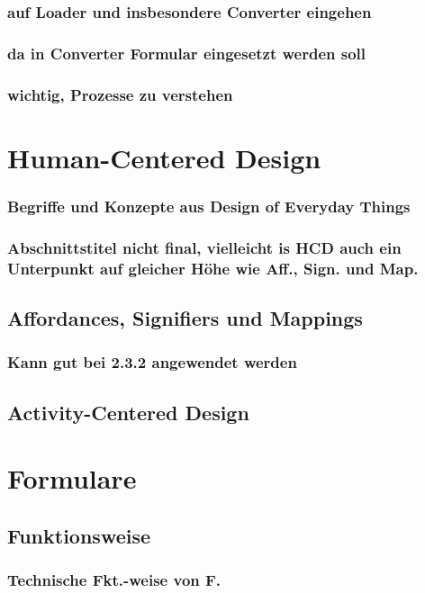 \documentclass[a4paper, 12pt, oneside, BCOR=1cm,toc=chapterentrywithdots]{scrbook}
\begin{document}
\subsubsection{auf Loader und insbesondere Converter eingehen}
\subsubsection{da in Converter Formular eingesetzt werden soll}
\subsubsection{wichtig, Prozesse zu verstehen}

\section{Human-Centered Design}
\subsubsection{Begriffe und Konzepte aus Design of Everyday Things}
\subsubsection{Abschnittstitel nicht final, vielleicht is HCD auch ein Unterpunkt auf gleicher Höhe wie Aff., Sign. und Map.}
\subsection{Affordances, Signifiers und Mappings}
\subsubsection{Kann gut bei 2.3.2 angewendet werden}
\subsection{Activity-Centered Design}

\section{Formulare}
\cite{wroblewskiWebForm2008}
\subsection{Funktionsweise}
\subsubsection{Technische Fkt.-weise von F.}
\end{document}
